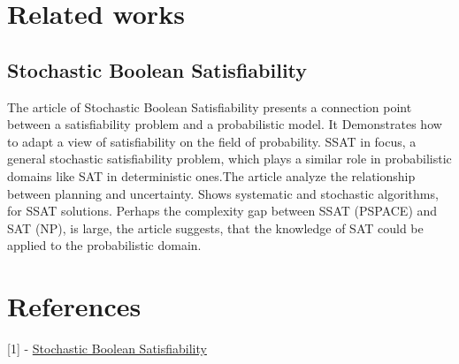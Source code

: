 \documentclass{article}
\begin{document}
\section{Related works}

\subsection{Stochastic Boolean Satisfiability}

The article of Stochastic Boolean Satisfiability presents a connection point between a satisfiability problem and a probabilistic model. It Demonstrates how to adapt a view of satisfiability on the field of probability. SSAT in focus, a general stochastic satisfiability problem, which plays a similar role in probabilistic domains like SAT in deterministic ones.The article analyze the relationship between planning and uncertainty. Shows systematic and stochastic algorithms, for SSAT solutions. Perhaps the complexity gap between SSAT (PSPACE) and SAT (NP), is large, the article suggests, that the knowledge of SAT could be applied to the probabilistic domain.

\section{References}

[1] - \href{https://link.springer.com/article/10.1023/A:1017584715408}{Stochastic Boolean Satisfiability}
\end{document}
